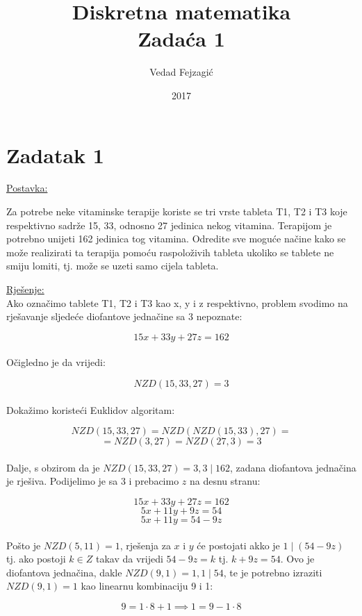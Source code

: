 \documentclass[12pt]{article}
\title{
  Diskretna matematika\\
  \large Zadaća 1 \\}
\author{Vedad Fejzagić}
\date{2017}
\begin{document}
\maketitle

\newpage

\section*{Zadatak 1\label{Z1}}

\underline{Postavka:}

Za potrebe neke vitaminske terapije koriste se tri vrste tableta T1, T2 i T3 koje respektivno sadrže 15, 33, odnosno 27 jedinica nekog vitamina. Terapijom je potrebno unijeti 162 jedinica tog vitamina. Odredite sve moguće načine kako se može realizirati ta terapija pomoću raspoloživih tableta ukoliko se tablete ne smiju lomiti, tj. može se uzeti samo cijela tableta.

\underline{Rješenje:}\\

\hspace{0.65cm}Ako označimo tablete T1, T2 i T3 kao x, y i z respektivno, problem svodimo na rješavanje sljedeće diofantove jednačine sa 3 nepoznate:

$$15x + 33y + 27z = 162$$\\

Očigledno je da vrijedi:

$$NZD(15, 33, 27) = 3$$\\

Dokažimo koristeći Euklidov algoritam:

$$NZD(15, 33, 27) = NZD(NZD(15, 33), 27) =$$ 
$$= NZD(3, 27) = NZD(27, 3) = 3$$\\

Dalje, s obzirom da je $NZD(15, 33, 27) = 3, 3 \mid 162$, zadana diofantova jednačina je rješiva. Podijelimo je sa $3$ i prebacimo $z$ na desnu stranu:

$$15x + 33y + 27z = 162$$
$$5x + 11y + 9z = 54$$
$$5x + 11y = 54 - 9z$$\\

Pošto je $NZD(5, 11) = 1$, rješenja za $x$ i $y$ će postojati akko je $1 \mid (54 - 9z)$ tj. ako postoji $k\in Z$ takav da vrijedi $54 - 9z = k$ tj. $k + 9z = 54$. Ovo je diofantova jednačina, dakle $NZD(9, 1) = 1, 1 \mid 54$, te je potrebno izraziti $NZD(9, 1) = 1$ kao linearnu kombinaciju 9 i 1:

$$9 = 1 \cdot 8 + 1 \implies 1 = 9 - 1 \cdot 8$$\\
\end{document}
